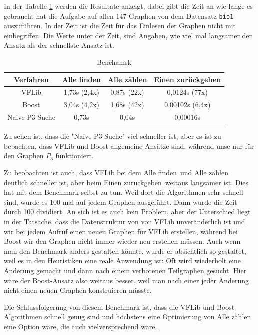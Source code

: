\documentclass[12pt,a4paper,onecolumn,oneside,titlepage]{article}
\newcommand{\vars}{\texttt}
\begin{document}
In der Tabelle \ref{tab:benchmark_isomorph} werden die Resultate anzeigt, dabei gibt die Zeit an wie lange es gebraucht hat die Aufgabe auf allen 147 Graphen von dem Datensatz \vars{bio1} auszuführen. In der Zeit ist die Zeit für das Einlesen der Graphen nicht mit einbegriffen. Die Werte unter der Zeit, sind Angaben, wie viel mal langsamer der Ansatz als der schnellste Ansatz ist.
\begin{table}

\centering

\begin{tabular}{c ccc}
\hline 
Verfahren & Alle finden & Alle zählen & Einen zurückgeben \\ 
\hline 
VFLib & 1,73s (2,4x) & 0,87s (22x) & 0,0124s (77x) \\ 
Boost & 3,04s (4,2x) & 1,68s (42x) & 0,00102s (6,4x) \\ 
Naive P3-Suche & 0,73s & 0,04s & 0,00016s \\ 
\hline 
\end{tabular} 
\caption{Benchamrk}
\label{tab:benchmark_isomorph}
\end{table}
Zu sehen ist, dass die "Naive P3-Suche" viel schneller ist, aber es ist zu bebachten, dass VFLib und Boost allgemeine Ansätze sind, während unse nur für den Graphen $P_3$ funktioniert. 

Zu beobachten ist auch, dass VFLib bei dem \glqq Alle finden\grqq \, und \glqq Alle zählen\grqq \, deutlich schneller ist, aber beim \glqq Einen zurückgeben\grqq \, weitaus langsamer ist. Dies hat mit dem Benchmark selbst zu tun. Weil dort die Algorithmen sehr schnell sind, wurde es 100-mal auf jedem Graphen ausgeführt. Dann wurde die Zeit durch 100 dividiert. 
An sich ist es auch kein Problem, aber der Unterschied liegt in der Tatsache, dass die Datenstruktur von von VFLib unveränderlich ist und wir bei jedem Aufruf einen neuen Graphen für VFLib erstellen, während bei Boost wir den Graphen nicht immer wieder neu erstellen müssen. Auch wenn man den Benchmark anders gestalten könnte, wurde er absichtlich so gestaltet, weil es in den Heuristiken eine reale Anwendung ist: Oft wird wiederholt eine Änderung gemacht und dann nach einem verbotenen Teilgraphen gesucht. Hier wäre der Boost-Ansatz also weitaus besser, weil man nach einer jeder Änderung nicht einen neuen Graphen konstruieren müsste.

Die Schlussfolgerung von diesem Benchmark ist, dass die VFLib und Boost Algorithmen schnell genug sind und höchstens eine Optimierung von \glqq   Alle zählen\grqq \, eine Option wäre, die auch vielversprechend wäre.
\end{document}
